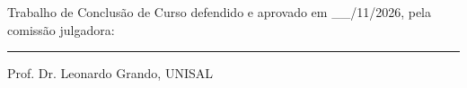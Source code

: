 \documentclass[
	article,
	12pt,				%
	oneside,
	a4paper,			%
	english,			%
	brazil				%
	]{abntex2}
\renewcommand{\ABNTEXchapterfontsize}{\normalsize}
\begin{document}
\begin{folhadeaprovacao}
	\begingroup\centering
	\ABNTEXchapterfontsize{\imprimirautor}

	\vspace*{1.5cm}

	\ABNTEXchapterfontsize{\rmfamily\bfseries\imprimirtitulo}

	\vspace{1.5cm}

	\noindent\hspace*{8cm}%
	\begin{minipage}{\dimexpr\textwidth-8cm\relax}
		\raggedright
		\imprimirpreambulo
	\end{minipage}

	\vspace{1.5cm}
	\endgroup

	Trabalho de Conclusão de Curso defendido e aprovado em \_\_/11/2026, pela
	comissão julgadora:

	\centering

	\vspace{1.5cm}
	\rule{12cm}{0.4pt}\par
	Prof. Dr. Leonardo Grando, UNISAL\\


	\vfill

	\imprimirlocal\\
	\imprimirdata

	\vspace{3cm}
\end{folhadeaprovacao}
\clearpage

\end{document}
